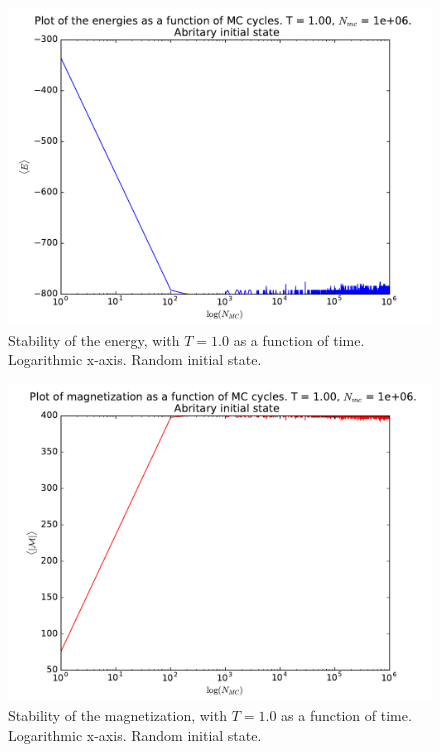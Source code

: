 \documentclass[12pt]{article}
\begin{document}
\begin{figure}[H]
\centering
\includegraphics[width=\linewidth]{Plots/Energy_stability_logarithmic_T1.pdf}
\caption{Stability of the energy, with $T = 1.0$ as a function of time. Logarithmic x-axis. Random initial state.}
\label{fig:Energy_stab_log_T1}
\end{figure}
\begin{figure}[H]
\centering
\includegraphics[width=\linewidth]{Plots/Magnetization_stability_logarithmic_T1.pdf}
\caption{Stability of the magnetization, with $T = 1.0$ as a function of time. Logarithmic x-axis. Random initial state.}
\label{fig:Mag_stab_log_T1}
\end{figure}
\end{document}

